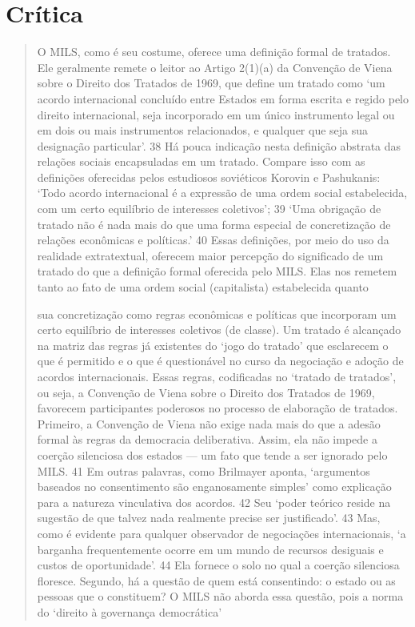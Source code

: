 \documentclass{article}
\begin{document}
\section{Crítica}

\begin{quote}

O MILS, como é seu costume, oferece uma definição formal de tratados. Ele geralmente remete
o leitor ao Artigo 2(1)(a) da Convenção de Viena sobre o Direito dos
Tratados de 1969, que define um tratado como ‘um acordo internacional concluído entre Estados em forma escrita e regido pelo direito
internacional, seja incorporado em um único instrumento legal ou em dois ou mais
instrumentos relacionados, e qualquer que seja sua designação particular’. 38 Há
pouca indicação nesta definição abstrata das relações sociais encapsuladas em um tratado. Compare isso com as definições oferecidas pelos estudiosos
soviéticos Korovin e Pashukanis: ‘Todo acordo internacional é a
expressão de uma ordem social estabelecida, com um certo equilíbrio de interesses
coletivos’; 39 ‘Uma obrigação de tratado não é nada mais do que uma forma especial de
concretização de relações econômicas e políticas.’ 40 Essas definições, por meio do uso da realidade extratextual, oferecem maior percepção
do significado de um tratado do que a definição formal oferecida pelo MILS. Elas
nos remetem tanto ao fato de uma ordem social (capitalista) estabelecida quanto

sua concretização como regras econômicas e políticas que incorporam um certo
equilíbrio de interesses coletivos (de classe).
Um tratado é alcançado na matriz das regras já existentes do
‘jogo do tratado’ que esclarecem o que é permitido e o que é questionável
no curso da negociação e adoção de acordos internacionais. Essas
regras, codificadas no ‘tratado de tratados’, ou seja, a Convenção de Viena
sobre o Direito dos Tratados de 1969, favorecem participantes poderosos no processo de elaboração de tratados. Primeiro, a Convenção de Viena não exige nada
mais do que a adesão formal às regras da democracia deliberativa. Assim,
ela não impede a coerção silenciosa dos estados — um fato que tende a ser
ignorado pelo MILS. 41 Em outras palavras, como Brilmayer aponta, ‘argumentos
baseados no consentimento são enganosamente simples’ como explicação para a natureza vinculativa
dos acordos. 42 Seu ‘poder teórico reside na sugestão de que
talvez nada realmente precise ser justiﬁcado’. 43 Mas, como é evidente para qualquer
observador de negociações internacionais, ‘a barganha frequentemente ocorre
em um mundo de recursos desiguais e custos de oportunidade’. 44 Ela fornece o
solo no qual a coerção silenciosa floresce. Segundo, há a questão de
quem está consentindo: o estado ou as pessoas que o constituem? O MILS não
aborda essa questão, pois a norma do ‘direito à governança democrática’


\end{quote}
\end{document}
